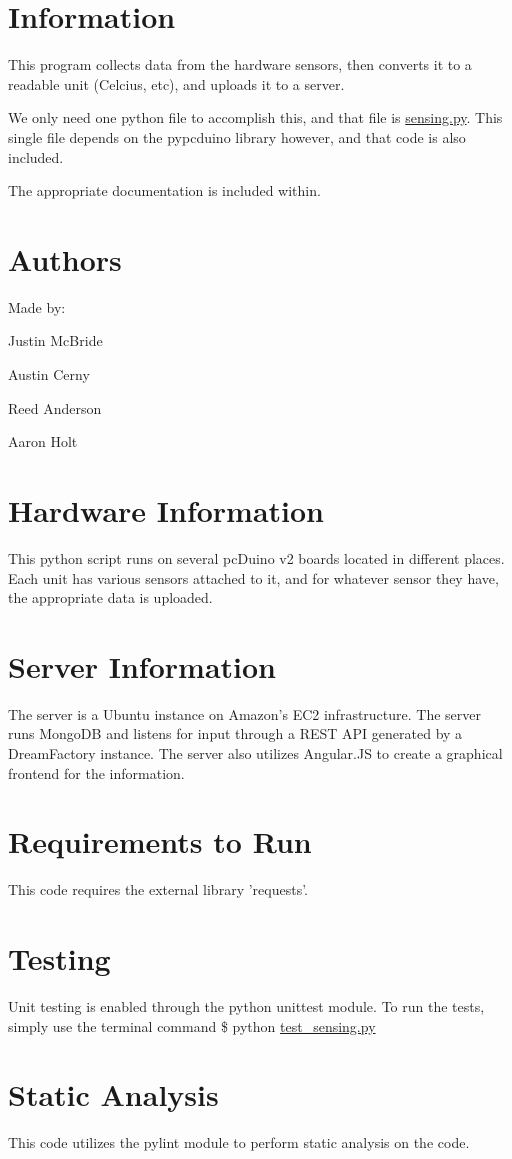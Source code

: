 \hypertarget{index_information}{}\section{Information}\label{index_information}
This program collects data from the hardware sensors, then converts it to a readable unit (Celcius, etc), and uploads it to a server.

We only need one python file to accomplish this, and that file is \hyperlink{sensing_8py}{sensing.\-py}. This single file depends on the pypcduino library however, and that code is also included.

The appropriate documentation is included within.\hypertarget{index_authors}{}\section{Authors}\label{index_authors}
Made by\-:
\begin{DoxyItemize}
\item Justin Mc\-Bride
\item Austin Cerny
\item Reed Anderson
\item Aaron Holt
\end{DoxyItemize}\hypertarget{index_hardwareinfo}{}\section{Hardware Information}\label{index_hardwareinfo}
This python script runs on several pc\-Duino v2 boards located in different places. Each unit has various sensors attached to it, and for whatever sensor they have, the appropriate data is uploaded.\hypertarget{index_serverinfo}{}\section{Server Information}\label{index_serverinfo}
The server is a Ubuntu instance on Amazon's E\-C2 infrastructure. The server runs Mongo\-D\-B and listens for input through a R\-E\-S\-T A\-P\-I generated by a Dream\-Factory instance. The server also utilizes Angular.\-J\-S to create a graphical frontend for the information.\hypertarget{index_requirements}{}\section{Requirements to Run}\label{index_requirements}
This code requires the external library 'requests'.\hypertarget{index_testing}{}\section{Testing}\label{index_testing}
Unit testing is enabled through the python unittest module. To run the tests, simply use the terminal command \$ python \hyperlink{test__sensing_8py}{test\-\_\-sensing.\-py}\hypertarget{index_static}{}\section{Static Analysis}\label{index_static}
This code utilizes the pylint module to perform static analysis on the code.

